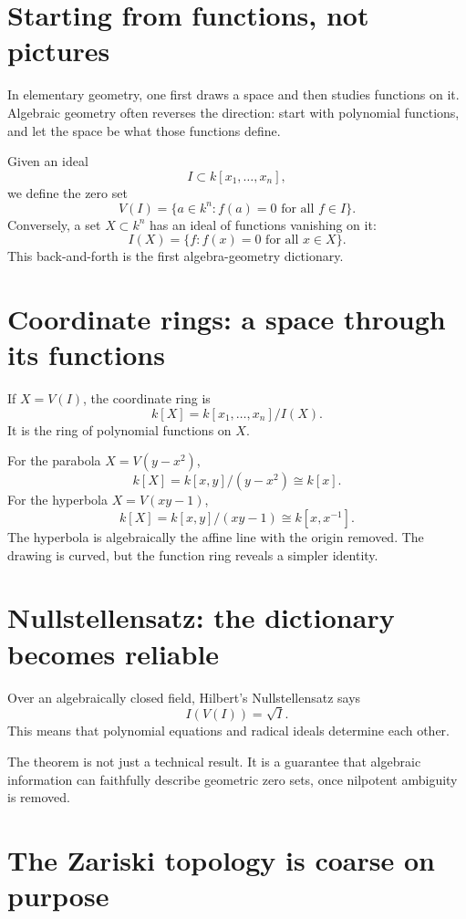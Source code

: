 
\section{Starting from functions, not pictures}

In elementary geometry, one first draws a space and then studies functions on it. Algebraic geometry often reverses the direction: start with polynomial functions, and let the space be what those functions define.

Given an ideal
\[
  I\subset k[x_1,\ldots,x_n],
\]
we define the zero set
\[
  V(I)=\{a\in k^n:f(a)=0\text{ for all }f\in I\}.
\]
Conversely, a set \(X\subset k^n\) has an ideal of functions vanishing on it:
\[
  I(X)=\{f:f(x)=0\text{ for all }x\in X\}.
\]
This back-and-forth is the first algebra-geometry dictionary.

\section{Coordinate rings: a space through its functions}

If \(X=V(I)\), the coordinate ring is
\[
  k[X]=k[x_1,\ldots,x_n]/I(X).
\]
It is the ring of polynomial functions on \(X\).

For the parabola \(X=V(y-x^2)\),
\[
  k[X]=k[x,y]/(y-x^2)\cong k[x].
\]
For the hyperbola \(X=V(xy-1)\),
\[
  k[X]=k[x,y]/(xy-1)\cong k[x,x^{-1}].
\]
The hyperbola is algebraically the affine line with the origin removed. The drawing is curved, but the function ring reveals a simpler identity.

\section{Nullstellensatz: the dictionary becomes reliable}

Over an algebraically closed field, Hilbert's Nullstellensatz says
\[
  I(V(I))=\sqrt I.
\]
This means that polynomial equations and radical ideals determine each other.

The theorem is not just a technical result. It is a guarantee that algebraic information can faithfully describe geometric zero sets, once nilpotent ambiguity is removed.

\section{The Zariski topology is coarse on purpose}

